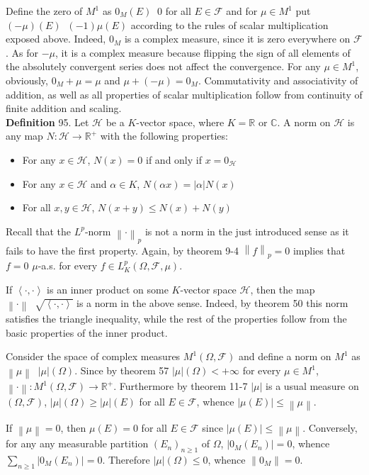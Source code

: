 \documentclass[a4paper]{article}
\newcommand{\brac}[1]{\left ( #1 \right )}
\newcommand{\abs}[1]{\left | #1 \right |}
\newcommand{\nrm}[1]{\left\| #1 \right \|}
\newcommand{\brkt}[1]{\left\langle #1 \right\rangle}
\newcommand{\Real}{\mathbb{R}}
\newcommand{\Cplx}{\mathbb{C}}
\newcommand{\Hcal}{\mathcal{H}}
\newcommand{\Fcal}{\mathcal{F}}
\newcommand{\defn}{\mathop{\overset{\Delta}{=}}\nolimits}
\begin{document}
Define the zero of $M^1$ as $0_M\brac{E}\defn0$ for all $E\in \Fcal$ and for $\mu \in M^1$ put $\brac{-\mu}\brac{E} \defn \brac{-1}\mu\brac{E}$ according to the rules of scalar multiplication exposed above. Indeed, $0_M$ is a complex measure, since it is zero everywhere on $\Fcal$. As for $-\mu$, it is a complex measure because flipping the sign of all elements of the absolutely convergent series does not affect the convergence. For any $\mu\in M^1$, obviously, $0_M + \mu = \mu$ and $\mu + \brac{-\mu}=0_M$. Commutativity and associativity of addition, as well as all properties of scalar multiplication follow from continuity of finite addition and scaling.\\

\noindent \textbf{Definition} 95.
Let $\Hcal$ be a $K$-vector space, where $K=\Real$ or $\Cplx$. A norm on $\Hcal$ is any map $N:\Hcal\to \Real^+$ with the following properties: \begin{itemize}
	\item For any $x\in \Hcal$, $N\brac{x} = 0$ if and only if $x=0_\Hcal$
	\item For any $x\in \Hcal$ and $\alpha \in K$, $N\brac{\alpha x} = \abs{\alpha} N\brac{x}$
	\item For all $x,y\in\Hcal$, $N\brac{x+y}\leq N\brac{x}+N\brac{y}$
\end{itemize}

Recall that the $L^p$-norm $\nrm{\cdot}_p$ is not a norm in the just introduced sense as it fails to have the first property. Again, by theorem 9-4 $\nrm{f}_p=0$ implies that $f=0$ $\mu$-a.s. for every $f\in L^p_K\brac{\Omega, \Fcal, \mu}$.

If $\brkt{\cdot, \cdot}$ is an inner product on some $K$-vector space $\Hcal$, then the map $\nrm{\cdot} \defn \sqrt{\brkt{\cdot, \cdot}}$ is a norm in the above sense. Indeed, by theorem 50 this norm satisfies the triangle inequality, while the rest of the properties follow from the basic properties of the inner product.

Consider the space of complex measures $M^1\brac{\Omega, \Fcal}$ and define a norm on $M^1$ as $\nrm{\mu}\defn \abs{\mu}\brac{\Omega}$. Since by theorem 57 $\abs{\mu}\brac{\Omega}<+\infty$ for every $\mu\in M^1$, $\nrm{\cdot}:M^1\brac{\Omega, \Fcal}\to\Real^+$. Furthermore by theorem 11-7 $\abs{\mu}$ is a usual measure on $\brac{\Omega, \Fcal}$, $\abs{\mu}\brac{\Omega}\geq \abs{\mu}\brac{E}$ for all $E\in \Fcal$, whence $\abs{\mu\brac{E}}\leq \nrm{\mu}$.

If $\nrm{\mu}=0$, then $\mu\brac{E} = 0$ for all $E\in \Fcal$ since $\abs{\mu\brac{E}}\leq \nrm{\mu}$. Conversely, for any any measurable partition $\brac{E_n}_{n\geq 1}$ of $\Omega$, $\abs{0_M\brac{E_n}}=0$, whence $\sum_{n\geq 1} \abs{0_M\brac{E_n}} = 0$. Therefore $\abs{\mu}\brac{\Omega}\leq 0$, whence $\nrm{0_M}=0$.
\end{document}
